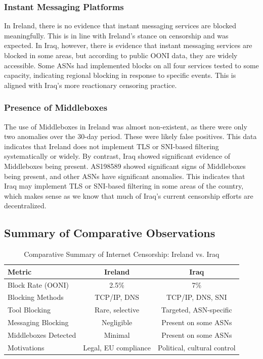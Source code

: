 \subsubsection{Instant Messaging Platforms}

In Ireland, there is no evidence that instant messaging services are blocked meaningfully. This is in line with Ireland's stance on censorship and was expected. In Iraq, however, there is evidence that instant messaging services are blocked in some areas, but according to public OONI data, they are widely accessible. Some ASNs had implemented blocks on all four services tested to some capacity, indicating regional blocking in response to specific events. This is aligned with Iraq's more reactionary censoring practice.

\subsubsection{Presence of Middleboxes}

The use of Middleboxes in Ireland was almost non-existent, as there were only two anomalies over the 30-day period. These were likely false positives. This data indicates that Ireland does not implement TLS or SNI-based filtering systematically or widely. By contrast, Iraq showed significant evidence of Middleboxes being present. AS198589 showed significant signs of Middleboxes being present, and other ASNs have significant anomalies. This indicates that Iraq may implement TLS or SNI-based filtering in some areas of the country, which makes sense as we know that much of Iraq's current censorship efforts are decentralized. 

\subsection{Summary of Comparative Observations}

\begin{table}[H]
\centering
\caption{Comparative Summary of Internet Censorship: Ireland vs. Iraq}
\begin{tabular}{lcc}
\toprule
\textbf{Metric} & \textbf{Ireland} & \textbf{Iraq} \\
\midrule
Block Rate (OONI) & 2.5\% & 7\% \\
Blocking Methods & TCP/IP, DNS & TCP/IP, DNS, SNI \\
Tool Blocking & Rare, selective & Targeted, ASN-specific \\
Messaging Blocking & Negligible & Present on some ASNs \\
Middleboxes Detected & Minimal & Present on some ASNs \\
Motivations & Legal, EU compliance & Political, cultural control \\
\bottomrule
\end{tabular}
\label{tab:comparison_summary}
\end{table}

